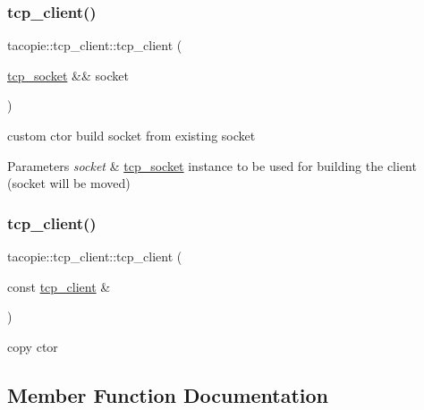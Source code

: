 \subsubsection{\texorpdfstring{tcp\+\_\+client()}{tcp\_client()}\hspace{0.1cm}{\footnotesize\ttfamily [2/3]}}
{\footnotesize\ttfamily tacopie\+::tcp\+\_\+client\+::tcp\+\_\+client (\begin{DoxyParamCaption}\item[{\hyperlink{classtacopie_1_1tcp__socket}{tcp\+\_\+socket} \&\&}]{socket }\end{DoxyParamCaption})\hspace{0.3cm}{\ttfamily [explicit]}}

custom ctor build socket from existing socket


\begin{DoxyParams}{Parameters}
{\em socket} & \hyperlink{classtacopie_1_1tcp__socket}{tcp\+\_\+socket} instance to be used for building the client (socket will be moved) \\
\hline
\end{DoxyParams}
\mbox{\label{classtacopie_1_1tcp__client_a5e326782c52f63814cc8f42a901ffaf6}} 
\subsubsection{\texorpdfstring{tcp\+\_\+client()}{tcp\_client()}\hspace{0.1cm}{\footnotesize\ttfamily [3/3]}}
{\footnotesize\ttfamily tacopie\+::tcp\+\_\+client\+::tcp\+\_\+client (\begin{DoxyParamCaption}\item[{const \hyperlink{classtacopie_1_1tcp__client}{tcp\+\_\+client} \&}]{ }\end{DoxyParamCaption})\hspace{0.3cm}{\ttfamily [delete]}}



copy ctor 



\subsection{Member Function Documentation}
\mbox{\label{classtacopie_1_1tcp__client_a120e3ec2902acc902f7a0b27074bda6b}} 
